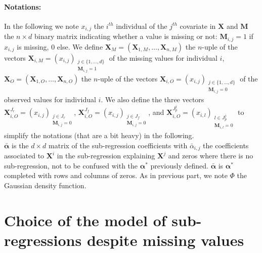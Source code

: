 \documentclass[12pt,a4paper]{report}
\begin{document}
	\paragraph{Notations:} In the following we note $x_{i,j}$ the $i^{th}$ individual of the $j^{th}$ covariate in $\boldsymbol{X}$ and $\boldsymbol{M}$ the $n\times d$ binary matrix indicating whether a value is missing or not: $\boldsymbol{M}_{i,j}=1$ if $x_{i,j}$ is missing, 0 else. 
	We define $\boldsymbol{X}_M=(\boldsymbol{X}_{1,M},\dots,\boldsymbol{X}_{n,M})$ the $n$-uple of the vectors $\boldsymbol{X}_{i,M}=(x_{i,j})_{\substack{j \in \{1,\dots,d \} \\ \boldsymbol{M}_{i,j}=1}}$ of the missing values for individual $i$, $\boldsymbol{X}_O=(\boldsymbol{X}_{1,O},\dots,\boldsymbol{X}_{n,O})$ the $n$-uple of the vectors $\boldsymbol{X}_{i,O}=\left(x_{i,j}\right)_{\substack{j \in \{1,\dots,d \} \\ \boldsymbol{M}_{i,j}=0}}$ of the observed values for individual $i$. %
	We also define the three vectors $\boldsymbol{X}_{i,O}^{J_r}=\left(x_{i,j}\right)_{\substack{j \in J_r \\ \boldsymbol{M}_{i,j}=0}} $, $\boldsymbol{X}_{i,O}^{J_f}=\left(x_{i,j}\right)_{\substack{j \in J_f \\ \boldsymbol{M}_{i,j}=0}} $, and $\boldsymbol{X}_{i,O}^{J_p^j}=\left(x_{i,l}\right)_{\substack{l \in J_p^j \\ \boldsymbol{M}_{i,l}=0}} $ to simplify the notations (that are a bit heavy) in the following.\\
	
	$\bar{\boldsymbol{\alpha}}$ is the $d\times d$ matrix of the sub-regression coefficients with $\bar{\alpha}_{i,j}$ the coefficients associated to $\boldsymbol{X}^i$ in the sub-regression explaining $\boldsymbol{X}^j$ and zeros where there is no sub-regression, not to be confused with the $\boldsymbol{\alpha}^*$ previously defined. $\bar{\boldsymbol{\alpha}}$ is  $\boldsymbol{\alpha}^*$ completed with rows and columns of zeros. As in previous part, we note $\Phi$ the Gaussian density function. \\  
	


\section{Choice of the model of sub-regressions despite missing values}\label{nbcomp}
\end{document}
